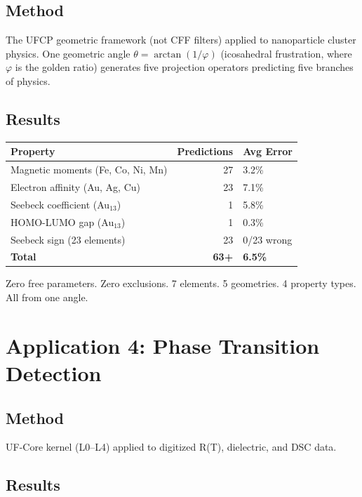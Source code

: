 \documentclass[11pt, a4paper]{article}
\begin{document}
\subsection{Method}

The UFCP geometric framework (not CFF filters) applied to
nanoparticle cluster physics. One geometric angle
$\theta = \arctan(1/\varphi)$ (icosahedral frustration, where
$\varphi$ is the golden ratio) generates five projection
operators predicting five branches of physics.

\subsection{Results}

\begin{center}
\begin{tabular}{@{}lrl@{}}
\toprule
\textbf{Property} & \textbf{Predictions} & \textbf{Avg Error} \\
\midrule
Magnetic moments (Fe, Co, Ni, Mn) & 27 & 3.2\% \\
Electron affinity (Au, Ag, Cu) & 23 & 7.1\% \\
Seebeck coefficient (Au$_{13}$) & 1 & 5.8\% \\
HOMO-LUMO gap (Au$_{13}$) & 1 & 0.3\% \\
Seebeck sign (23 elements) & 23 & 0/23 wrong \\
\midrule
\textbf{Total} & \textbf{63+} & \textbf{6.5\%} \\
\bottomrule
\end{tabular}
\end{center}

Zero free parameters. Zero exclusions. 7 elements. 5
geometries. 4 property types. All from one angle.

\section{Application 4: Phase Transition Detection}

\subsection{Method}

UF-Core kernel (L0--L4) applied to digitized R(T), dielectric,
and DSC data.

\subsection{Results}
\end{document}
